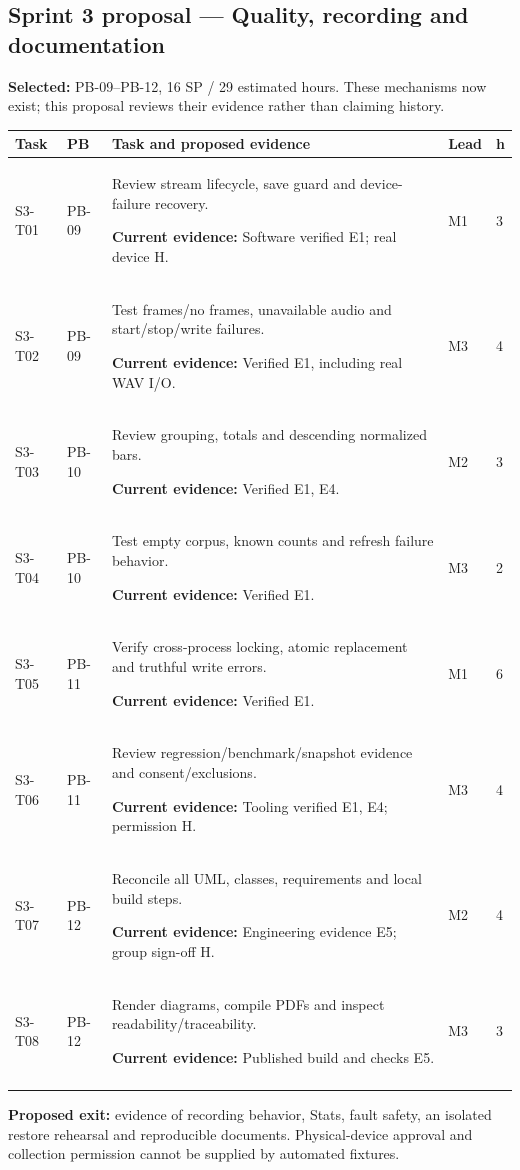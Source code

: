 \documentclass[11pt,a4paper]{article}
\newcommand{\sprinttask}[6]{#1 & #2 & #3\par\smallskip\textbf{Current evidence:} #6 & #4 & #5\\\addlinespace}
\begin{document}
\subsection{Sprint 3 proposal --- Quality, recording and documentation}
\textbf{Selected:} PB-09--PB-12, 16 SP / 29 estimated hours. These mechanisms
now exist; this proposal reviews their evidence rather than claiming history.
\begingroup\small
\begin{longtable}{L{1.3cm}L{1.2cm}L{8.2cm}L{1.1cm}L{0.8cm}}
\toprule\textbf{Task} & \textbf{PB} & \textbf{Task and proposed evidence} & \textbf{Lead} & \textbf{h}\\\midrule\endhead
\sprinttask{S3-T01}{PB-09}{Review stream lifecycle, save guard and device-failure recovery.}{M1}{3}{Software verified E1; real device H.}
\sprinttask{S3-T02}{PB-09}{Test frames/no frames, unavailable audio and start/stop/write failures.}{M3}{4}{Verified E1, including real WAV I/O.}
\sprinttask{S3-T03}{PB-10}{Review grouping, totals and descending normalized bars.}{M2}{3}{Verified E1, E4.}
\sprinttask{S3-T04}{PB-10}{Test empty corpus, known counts and refresh failure behavior.}{M3}{2}{Verified E1.}
\sprinttask{S3-T05}{PB-11}{Verify cross-process locking, atomic replacement and truthful write errors.}{M1}{6}{Verified E1.}
\sprinttask{S3-T06}{PB-11}{Review regression/benchmark/snapshot evidence and consent/exclusions.}{M3}{4}{Tooling verified E1, E4; permission H.}
\sprinttask{S3-T07}{PB-12}{Reconcile all UML, classes, requirements and local build steps.}{M2}{4}{Engineering evidence E5; group sign-off H.}
\sprinttask{S3-T08}{PB-12}{Render diagrams, compile PDFs and inspect readability/traceability.}{M3}{3}{Published build and checks E5.}
\bottomrule\end{longtable}\endgroup
\textbf{Proposed exit:} evidence of recording behavior, Stats, fault safety,
an isolated restore rehearsal and reproducible documents. Physical-device
approval and collection permission cannot be supplied by automated fixtures.
\end{document}
